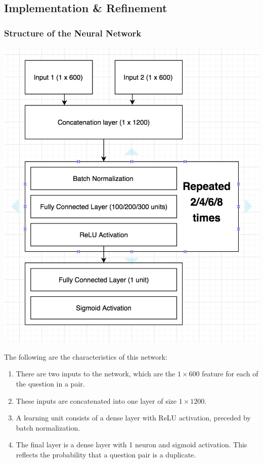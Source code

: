 \documentclass{article}
\begin{document}
\subsection{Implementation \& Refinement}

\subsubsection{Structure of the Neural Network}

\noindent\includegraphics[width=\textwidth]{neural_network}

The following are the characteristics of this network:

\begin{enumerate}
\item{There are two inputs to the network, which are the $1 \times 600$ feature for each of the question in a pair.}
\item{These inputs are concatenated into one layer of size $1 \times 1200$.}
\item{A learning unit consists of a dense layer with ReLU activation, preceded by batch normalization.}
\item{The final layer is a dense layer with 1 neuron and sigmoid activation. This reflects the probability that a question pair is a duplicate.}
\end{enumerate}
\end{document}
